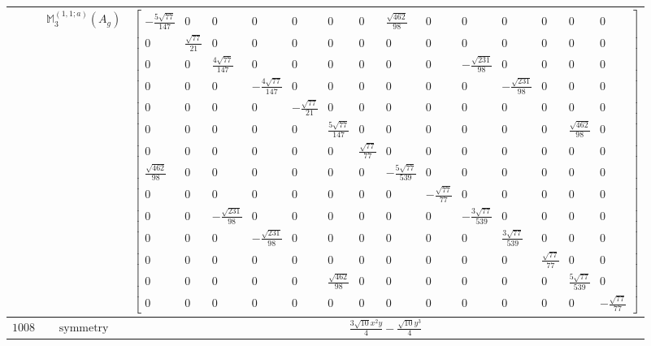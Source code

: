 \documentclass[fleqn,8pt,landscape]{jsarticle}
\begin{document}
\begin{longtable}{ccc}
$  $ & $ \mathbb{M}_{3}^{(1,1;a)}(A_{g}) $ & $ \begin{bmatrix} - \frac{5 \sqrt{77}}{147} & 0 & 0 & 0 & 0 & 0 & 0 & \frac{\sqrt{462}}{98} & 0 & 0 & 0 & 0 & 0 & 0 \\ 0 & \frac{\sqrt{77}}{21} & 0 & 0 & 0 & 0 & 0 & 0 & 0 & 0 & 0 & 0 & 0 & 0 \\ 0 & 0 & \frac{4 \sqrt{77}}{147} & 0 & 0 & 0 & 0 & 0 & 0 & - \frac{\sqrt{231}}{98} & 0 & 0 & 0 & 0 \\ 0 & 0 & 0 & - \frac{4 \sqrt{77}}{147} & 0 & 0 & 0 & 0 & 0 & 0 & - \frac{\sqrt{231}}{98} & 0 & 0 & 0 \\ 0 & 0 & 0 & 0 & - \frac{\sqrt{77}}{21} & 0 & 0 & 0 & 0 & 0 & 0 & 0 & 0 & 0 \\ 0 & 0 & 0 & 0 & 0 & \frac{5 \sqrt{77}}{147} & 0 & 0 & 0 & 0 & 0 & 0 & \frac{\sqrt{462}}{98} & 0 \\ 0 & 0 & 0 & 0 & 0 & 0 & \frac{\sqrt{77}}{77} & 0 & 0 & 0 & 0 & 0 & 0 & 0 \\ \frac{\sqrt{462}}{98} & 0 & 0 & 0 & 0 & 0 & 0 & - \frac{5 \sqrt{77}}{539} & 0 & 0 & 0 & 0 & 0 & 0 \\ 0 & 0 & 0 & 0 & 0 & 0 & 0 & 0 & - \frac{\sqrt{77}}{77} & 0 & 0 & 0 & 0 & 0 \\ 0 & 0 & - \frac{\sqrt{231}}{98} & 0 & 0 & 0 & 0 & 0 & 0 & - \frac{3 \sqrt{77}}{539} & 0 & 0 & 0 & 0 \\ 0 & 0 & 0 & - \frac{\sqrt{231}}{98} & 0 & 0 & 0 & 0 & 0 & 0 & \frac{3 \sqrt{77}}{539} & 0 & 0 & 0 \\ 0 & 0 & 0 & 0 & 0 & 0 & 0 & 0 & 0 & 0 & 0 & \frac{\sqrt{77}}{77} & 0 & 0 \\ 0 & 0 & 0 & 0 & 0 & \frac{\sqrt{462}}{98} & 0 & 0 & 0 & 0 & 0 & 0 & \frac{5 \sqrt{77}}{539} & 0 \\ 0 & 0 & 0 & 0 & 0 & 0 & 0 & 0 & 0 & 0 & 0 & 0 & 0 & - \frac{\sqrt{77}}{77} \end{bmatrix} $ \\ \hline
$ 1008 $ & $ \text{symmetry} $ & $ \frac{3 \sqrt{10} x^{2} y}{4} - \frac{\sqrt{10} y^{3}}{4} $ \\

\end{longtable}
\end{document}

